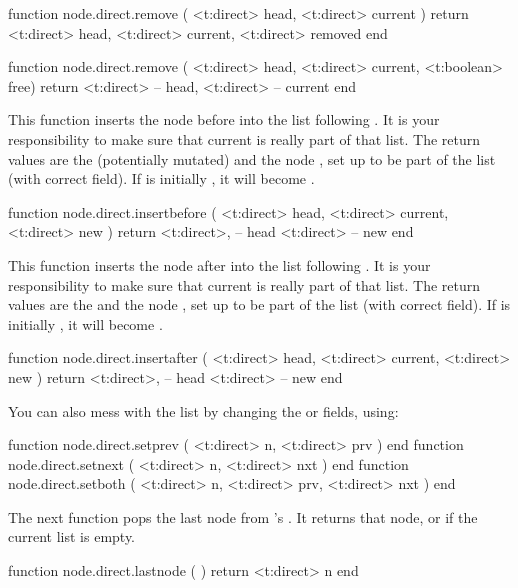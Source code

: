 \starttyping[option=LUA]
function node.direct.remove ( <t:direct> head, <t:direct> current )
    return
        <t:direct> head,
        <t:direct> current,
        <t:direct> removed
end

function node.direct.remove ( <t:direct> head, <t:direct> current, <t:boolean> free)
    return
        <t:direct> -- head,
        <t:direct> -- current
end
\stoptyping

This function inserts the node  before  into the list
following . It is your responsibility to make sure that \type
{current} is really part of that list. The return values are the (potentially
mutated)  and the node , set up to be part of the list
(with correct  field). If  is initially , it
will become .

\starttyping[option=LUA]
function node.direct.insertbefore (
    <t:direct> head,
    <t:direct> current,
    <t:direct> new
)
    return
        <t:direct>, -- head
        <t:direct>  -- new
end
\stoptyping

This function inserts the node  after  into the list
following . It is your responsibility to make sure that \type
{current} is really part of that list. The return values are the  and
the node , set up to be part of the list (with correct 
field). If  is initially , it will become .

\starttyping[option=LUA]
function node.direct.insertafter (
    <t:direct> head,
    <t:direct> current,
    <t:direct> new
)
    return
        <t:direct>, -- head
        <t:direct>  -- new
end
\stoptyping

You can also mess with the list by changing the  or  fields, using:

\starttyping[option=LUA]
function node.direct.setprev ( <t:direct> n, <t:direct> prv                 ) end
function node.direct.setnext ( <t:direct> n, <t:direct> nxt                 ) end
function node.direct.setboth ( <t:direct> n, <t:direct> prv, <t:direct> nxt ) end
\stoptyping

The next function pops the last node from \TEX's . It returns
that node, or  if the current list is empty.

\starttyping[option=LUA]
function node.direct.lastnode ( )
    return <t:direct> n
end
\stoptyping

